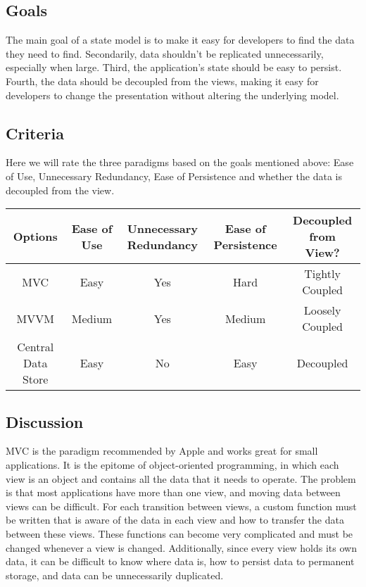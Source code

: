 \documentclass[letterpaper,10pt,titlepage]{article}
\begin{document}
\subsection{Goals}
The main goal of a state model is to make it easy for developers to find the data they need to find. Secondarily, data shouldn't be replicated unnecessarily, especially when large. Third, the application's state should be easy to persist. Fourth, the data should be decoupled from the views, making it easy for developers to change the presentation without altering the underlying model.

\subsection{Criteria}
Here we will rate the three paradigms based on the goals mentioned above: Ease of Use, Unnecessary Redundancy, Ease of Persistence and whether the data is decoupled from the view.
\begin{center}
\begin{tabular}{ |c|c|c|c|c| }
 \hline
 Options & Ease of Use & Unnecessary Redundancy & Ease of Persistence & Decoupled from View? \\ \hline
 MVC & Easy & Yes & Hard & Tightly Coupled \\ \hline
 MVVM & Medium & Yes & Medium & Loosely Coupled \\ \hline
 Central Data Store & Easy & No & Easy & Decoupled \\
 \hline
\end{tabular}
\end{center}

\subsection{Discussion}
MVC is the paradigm recommended by Apple and works great for small applications. It is the epitome of object-oriented programming, in which each view is an object and contains all the data that it needs to operate. The problem is that most applications have more than one view, and moving data between views can be difficult. For each transition between views, a custom function must be written that is aware of the data in each view and how to transfer the data between these views. These functions can become very complicated and must be changed whenever a view is changed. Additionally, since every view holds its own data, it can be difficult to know where data is, how to persist data to permanent storage, and data can be unnecessarily duplicated.
\end{document}
